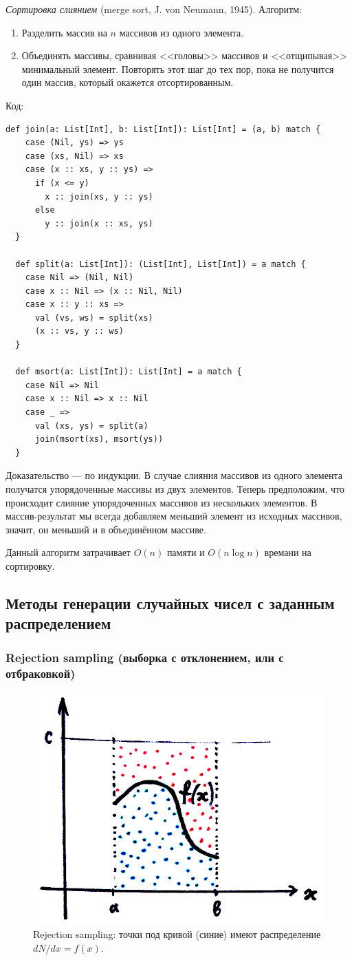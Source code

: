 \documentclass{book}
\begin{document}
\textit{Сортировка слиянием} (merge sort, J. von Neumann, 1945). Алгоритм:
\begin{enumerate}
  \item Разделить массив на $n$ массивов из одного элемента.
  \item Объединять массивы, сравнивая <<головы>> массивов и <<отщипывая>>
    минимальный элемент. Повторять этот шаг до тех пор, пока не получится один
    массив, который окажется отсортированным.
\end{enumerate}
Код:
\begin{verbatim}
def join(a: List[Int], b: List[Int]): List[Int] = (a, b) match {
    case (Nil, ys) => ys
    case (xs, Nil) => xs
    case (x :: xs, y :: ys) =>
      if (x <= y)
        x :: join(xs, y :: ys)
      else
        y :: join(x :: xs, ys)
  }

  def split(a: List[Int]): (List[Int], List[Int]) = a match {
    case Nil => (Nil, Nil)
    case x :: Nil => (x :: Nil, Nil)
    case x :: y :: xs =>
      val (vs, ws) = split(xs)
      (x :: vs, y :: ws)
  }

  def msort(a: List[Int]): List[Int] = a match {
    case Nil => Nil
    case x :: Nil => x :: Nil
    case _ =>
      val (xs, ys) = split(a)
      join(msort(xs), msort(ys))
  }
\end{verbatim}
Доказательство --- по индукции. В случае слияния массивов из одного элемента
получатся упорядоченные массивы из двух элементов. Теперь предположим, что
происходит слияние упорядоченных массивов из нескольких элементов. В
массив-результат мы всегда добавляем меньший элемент из исходных массивов,
значит, он меньший и в объединённом массиве.

Данный алгоритм затрачивает $O(n)$ памяти и $O(n\log n)$ времани на сортировку.

\subsection{Методы генерации случайных чисел с заданным распределением}

\subsubsection{Rejection sampling (выборка с отклонением, или с отбраковкой)}

\begin{figure}
	\includegraphics[width=0.6\linewidth]{rejection-sampling.png}
    \caption{\label{dots-for-monte-carlo}Rejection sampling: точки под кривой (синие) имеют
    распределение $dN/dx = f(x)$.}
\end{figure}
\end{document}
